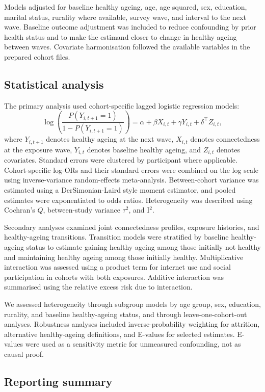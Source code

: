 \documentclass[pdflatex,sn-nature]{sn-jnl}
\begin{document}
Models adjusted for baseline healthy ageing, age, age squared, sex, education, marital status, rurality where available, survey wave, and interval to the next wave. Baseline outcome adjustment was included to reduce confounding by prior health status and to make the estimand closer to change in healthy ageing between waves. Covariate harmonisation followed the available variables in the prepared cohort files.

\subsection{Statistical analysis}

The primary analysis used cohort-specific lagged logistic regression models:
\[
\log\left(\frac{P(Y_{i,t+1}=1)}{1-P(Y_{i,t+1}=1)}\right)=\alpha+\beta X_{i,t}+\gamma Y_{i,t}+\delta^\top Z_{i,t},
\]
where $Y_{i,t+1}$ denotes healthy ageing at the next wave, $X_{i,t}$ denotes connectedness at the exposure wave, $Y_{i,t}$ denotes baseline healthy ageing, and $Z_{i,t}$ denotes covariates. Standard errors were clustered by participant where applicable. Cohort-specific log-ORs and their standard errors were combined on the log scale using inverse-variance random-effects meta-analysis. Between-cohort variance was estimated using a DerSimonian-Laird style moment estimator, and pooled estimates were exponentiated to odds ratios. Heterogeneity was described using Cochran's $Q$, between-study variance $\tau^2$, and I$^2$.

Secondary analyses examined joint connectedness profiles, exposure histories, and healthy-ageing transitions. Transition models were stratified by baseline healthy-ageing status to estimate gaining healthy ageing among those initially not healthy and maintaining healthy ageing among those initially healthy. Multiplicative interaction was assessed using a product term for internet use and social participation in cohorts with both exposures. Additive interaction was summarised using the relative excess risk due to interaction.

We assessed heterogeneity through subgroup models by age group, sex, education, rurality, and baseline healthy-ageing status, and through leave-one-cohort-out analyses. Robustness analyses included inverse-probability weighting for attrition, alternative healthy-ageing definitions, and E-values for selected estimates. E-values were used as a sensitivity metric for unmeasured confounding, not as causal proof.

\subsection{Reporting summary}
\end{document}
